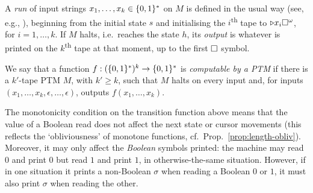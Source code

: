 \documentclass{lmcs}
\begin{document}
\begin{definition}
	\medskip
	
	A \emph{run} of input strings $x_1 , \dots , x_k  \in \{0,1\}^*$ on $M$ is defined in the usual way (see, e.g., \cite{Papadimitriou07}), beginning from the initial state $s$ and initialising the $i$\textsuperscript{th} tape to $\triangleright x_i \square^\omega$, for $i= 1 , \dots , k$. If $M$ halts, i.e.\ reaches the state $h$, its \emph{output} is whatever is printed on the $k$\textsuperscript{th} tape at that moment, up to the first $\square$ symbol.
	
	
	We say that a function $f : (\{0,1\}^*)^k \to \{0,1\}^* $ is \emph{computable by a PTM} if there is a $k'$-tape PTM $M$, with $k' \geq k$, such that $M$ halts on every input and, for inputs $(x_1 , \dots , x_k, \epsilon, \dots , \epsilon)$, outputs $f(x_1, \dots ,  x_k)$.
\end{definition}

The monotonicity condition on the transition function above means that the value of a Boolean read does not affect the next state or cursor movements (this reflects the `obliviousness' of monotone functions, cf.~Prop.~\ref{prop:length-obliv}).
Moreover, it may only affect the \emph{Boolean} symbols printed: the machine may read $0$ and print $0$ but read $1$ and print $1$, in otherwise-the-same situation. However, if in one situation it prints a non-Boolean $\sigma$ when reading a Boolean $0$ or $1$, it must also print $\sigma$ when reading the other.
\end{document}
